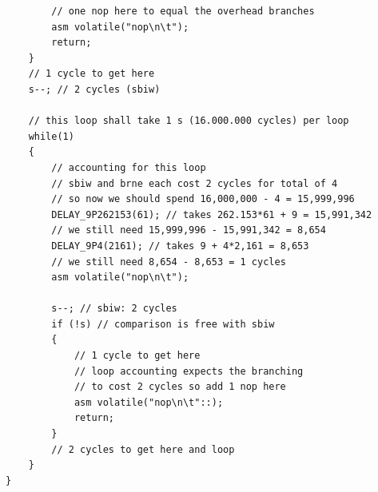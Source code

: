 \documentclass{article}
\begin{document}
\begin{lstlisting}
		// one nop here to equal the overhead branches
		asm volatile("nop\n\t");
		return;
	}
	// 1 cycle to get here
	s--; // 2 cycles (sbiw)

	// this loop shall take 1 s (16.000.000 cycles) per loop
	while(1)
	{
		// accounting for this loop
		// sbiw and brne each cost 2 cycles for total of 4
		// so now we should spend 16,000,000 - 4 = 15,999,996
		DELAY_9P262153(61); // takes 262.153*61 + 9 = 15,991,342
		// we still need 15,999,996 - 15,991,342 = 8,654
		DELAY_9P4(2161); // takes 9 + 4*2,161 = 8,653
		// we still need 8,654 - 8,653 = 1 cycles
		asm volatile("nop\n\t");

		s--; // sbiw: 2 cycles
		if (!s) // comparison is free with sbiw
		{
			// 1 cycle to get here
			// loop accounting expects the branching
			// to cost 2 cycles so add 1 nop here
			asm volatile("nop\n\t"::);
			return;
		}
		// 2 cycles to get here and loop
	}
}
\end{lstlisting}
\end{document}
